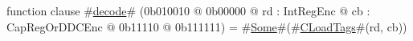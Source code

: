 function clause #\hyperref[zdecode]{decode}# (0b010010 @ 0b00000 @ rd : IntRegEnc @ cb : CapRegOrDDCEnc @    0b11110 @ 0b111111) = #\hyperref[zSome]{Some}#(#\hyperref[zCLoadTags]{CLoadTags}#(rd, cb))
